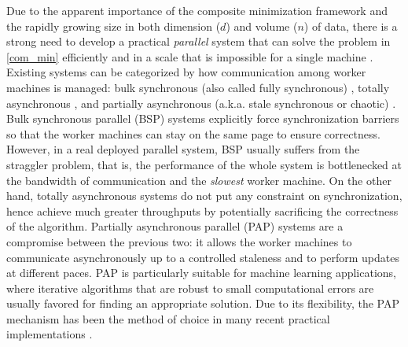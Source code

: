 \documentclass[leqno,onefignum,onetabnum]{siamart0516}
\newcommand{\pap}{PAP\xspace}
\newcommand{\aka}{{a.k.a.}\xspace}
\begin{document}
Due to the apparent importance of the composite minimization framework and the rapidly growing
size in both dimension ($d$) and volume ($n$) of data, there is a strong need to develop a practical \emph{parallel} system that can solve the problem in \eqref{com_min} efficiently and in a scale that is impossible for a single machine \cite{distrib_delay,BT_parallel, hadoop, delay_pga_linear, ssp_parameter, parameter_server,graphlab, spark}.
Existing systems can be categorized by how communication among worker machines is managed: bulk synchronous (also called fully synchronous) \cite{hadoop,bsp,spark}, totally asynchronous \cite{Baudet78,BT_parallel,graphlab}, and partially asynchronous (\aka stale synchronous or chaotic) \cite{distrib_delay,BT_parallel,ChazanMiranker69,delay_pga_linear,ssp_parameter,parameter_server,Tseng_linear_PAA}. Bulk synchronous parallel (BSP) systems explicitly force synchronization barriers so that the worker machines can stay on the same page to ensure correctness.
However, in a real deployed parallel system, BSP usually suffers from the straggler problem, that is, the performance of the whole system is bottlenecked at the bandwidth of communication and the \emph{slowest} worker machine. 
On the other hand, totally asynchronous systems do not put any constraint on synchronization, hence achieve much greater throughputs by potentially sacrificing the correctness of the algorithm. 
Partially asynchronous parallel (\pap) systems \cite{BT_parallel,ChazanMiranker69} are a compromise between the previous two: it allows the worker machines to communicate asynchronously up to a controlled staleness and to perform updates at different paces. \pap is particularly suitable for machine learning applications, where iterative algorithms that are robust to small computational errors are usually favored for finding an appropriate solution. Due to its flexibility, the \pap mechanism has been the method of choice in many recent practical implementations \cite{distrib_delay,delay_pga_linear,ssp_parameter,parameter_server,asy_coord_prox,hogwild}.
\end{document}
